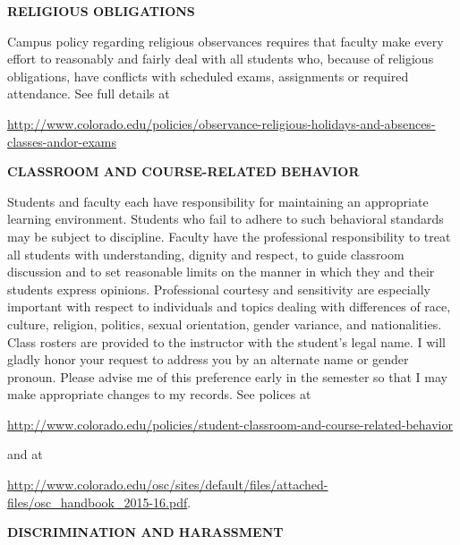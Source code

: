 \documentclass[11pt]{article}
\begin{document}

\bigskip

\textbf{\normalsize RELIGIOUS OBLIGATIONS}



Campus policy regarding religious observances requires that faculty
make every effort to reasonably and fairly deal with all students
who, because of religious obligations, have conflicts with scheduled
exams, assignments or required attendance. See full
details at

{\footnotesize \noindent \url{http://www.colorado.edu/policies/observance-religious-holidays-and-absences-classes-andor-exams} }


\bigskip

\textbf{\normalsize CLASSROOM AND COURSE-RELATED BEHAVIOR}

Students and faculty each have responsibility for maintaining an
appropriate learning environment. Students who fail to adhere to
such behavioral standards may be subject to discipline. Faculty have
the professional responsibility to treat all students with
understanding, dignity and respect, to guide classroom discussion
and to set reasonable limits on the manner in which they and their
students express opinions. Professional courtesy and sensitivity
are especially important with respect to individuals and topics
dealing with differences of race, culture, religion, politics,
sexual orientation, gender variance, and nationalities. Class
rosters are provided to the instructor with the student's legal
name. I will gladly honor your request to address you by an
alternate name or gender pronoun. Please advise me of this
preference early in the semester so that I may make appropriate
changes to my records. See polices at

{\footnotesize \url{http://www.colorado.edu/policies/student-classroom-and-course-related-behavior} } 

and at

\noindent
{\footnotesize\url{http://www.colorado.edu/osc/sites/default/files/attached-files/osc_handbook_2015-16.pdf}. }


\bigskip
\textbf{\normalsize DISCRIMINATION AND HARASSMENT}
\end{document}
